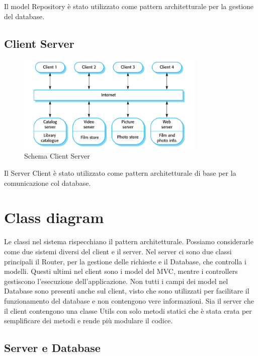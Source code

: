\documentclass[12pt, a4paper]{report}
\begin{document}
Il model Repository è stato utilizzato come pattern architetturale per la
gestione del database. 

\subsection{Client Server}

\begin{figure}[h]
  \centering
  \includegraphics[width=0.8\textwidth]{Client-Server.PNG}
  \caption{Schema Client Server}
\end{figure}

Il Server Client è stato utilizzato come pattern architetturale di base per la
comunicazione col database.

\newpage


\section{Class diagram}

Le classi nel sistema rispecchiano il pattern architetturale. Possiamo
considerarle come due sistemi diversi del client e il server. Nel server ci
sono due classi principali il Router, per la gestione delle richieste e il
Database, che controlla i modelli. Questi ultimi nel client sono i model del
MVC, mentre i controllers gestiscono l'esecuzione dell'applicazione. Non tutti
i campi dei model nel Database sono presenti anche sul client, visto che sono
utilizzati per facilitare il funzionamento del database e non contengono vere
informazioni. Sia il server che il client contengono una classe Utils con solo
metodi statici che è stata crata per semplificare dei metodi e rende più
modulare il codice.

\subsection{Server e Database}
\end{document}
